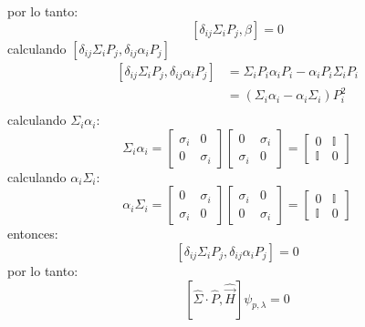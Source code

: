 por lo tanto:
\begin{equation*}
    \left[\delta_{ij} \Sigma_iP_j,\beta\right] =0
\end{equation*}
calculando $\left[\delta_{ij} \Sigma_iP_j,\delta_{ij}\alpha_iP_j\right]$
\begin{align*}
    \left[\delta_{ij} \Sigma_iP_j,\delta_{ij}\alpha_iP_j\right] &= \Sigma_i  P_i  \alpha_i P_i -\alpha_i P_i  \Sigma_i  P_i\\
    &= \left(\Sigma_i  \alpha_i -\alpha_i   \Sigma_i\right)  P_i^2\\
\end{align*}
calculando $\Sigma_i  \alpha_i$:
\begin{equation*}
    \Sigma_i  \alpha_i = \left[\begin{matrix}
        \sigma_i & 0 \\
        0 & \sigma_i 
    \end{matrix}\right]
    \left[\begin{matrix}
       0 & \sigma_i  \\
         \sigma_i & 0
    \end{matrix}\right] = \left[\begin{matrix}
       0& \mathbb{I}\\\mathbb{I} &0
    \end{matrix}\right]
\end{equation*}
calculando $\alpha_i  \Sigma_i$:
\begin{equation*}
    \alpha_i\Sigma_i  = \left[\begin{matrix}
        0 & \sigma_i  \\
          \sigma_i & 0
     \end{matrix}\right]
    \left[\begin{matrix}
        \sigma_i & 0 \\
        0 & \sigma_i 
    \end{matrix}\right]= 
    \left[\begin{matrix}
       0& \mathbb{I}\\\mathbb{I} &0
    \end{matrix}\right]
\end{equation*}
entonces:
\begin{equation*}
    \left[\delta_{ij} \Sigma_iP_j,\delta_{ij}\alpha_iP_j\right]= 0
\end{equation*}
por lo tanto:
\begin{equation*}
    \left[\hat{\Sigma}\cdot \hat{P}, \hat{\vec{H}}\right] \psi_{p,\lambda} = 0
\end{equation*}
